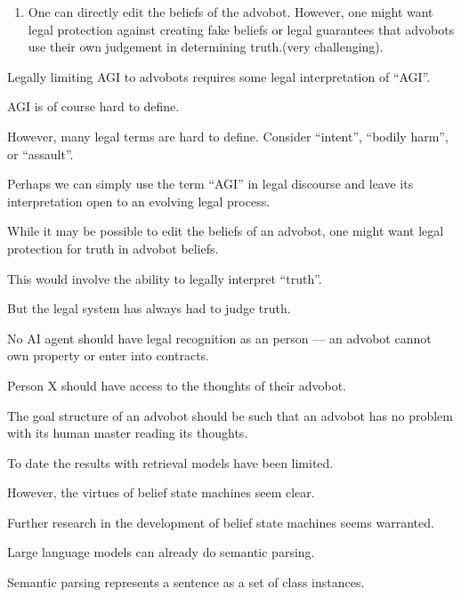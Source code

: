 {\begin{enumerate}
\vfill
\item One can directly edit the beliefs of the advobot.  However, one might want legal protection against creating fake beliefs or
legal guarantees that advobots use their own judgement in determining truth.(very challenging).
\end{enumerate}


Legally limiting AGI to advobots requires some legal interpretation of ``AGI''.

\vfill
AGI is of course hard to define.

\vfill
However, many legal terms are hard to define.  Consider ``intent'', ``bodily harm'', or ``assault''.

\vfill
Perhaps we can simply use the term ``AGI'' in legal discourse and leave its interpretation open to an evolving legal process.


While it may be possible to edit the beliefs of an advobot, one might want legal protection for truth in advobot beliefs.

\vfill
This would involve the ability to legally interpret ``truth''.

\vfill
But the legal system has always had to judge truth.


No AI agent should have legal recognition as an person --- an advobot cannot own property or enter into contracts.

\vfill
Person X should have access to the thoughts of their advobot.

\vfill
The goal structure of an advobot should be such that an advobot has no problem
with its human master reading its thoughts.


To date the results with retrieval models have been limited.

\vfill
However, the virtues of belief state machines seem clear.

\vfill
Further research in the development of belief state machines seems warranted.


Large language models can already do semantic parsing.

\vfill
Semantic parsing represents a sentence as a set of class instances.

}
